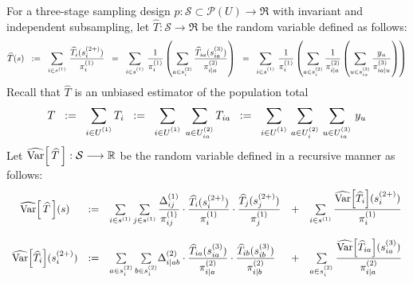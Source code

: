 \begin{theorem}
\mbox{}
\vskip 0.1cm
\noindent
For a three-stage sampling design $p : \mathcal{S} \subset \mathcal{P}(U) \longrightarrow \Re$
with invariant and independent subsampling,
let $\widehat{T} : \mathcal{S} \longrightarrow \Re$ be the random variable defined as follows:
\begin{equation*}
\widehat{T}(s)
\;\;:=\;\; \sum_{i\in s^{(1)}}\,\frac{\widehat{T}_{i}(s^{(2+)}_{i})}{\pi^{(1)}_{i}}
\;\; =\;\; \sum_{i\in s^{(1)}_{\color{white}i}}\,\frac{1}{\pi^{(1)}_{i}}\left(\sum_{a \in s^{(2)}_{i}} \dfrac{\widehat{T}_{ia}(s^{(3)}_{ia})}{\pi^{(2)}_{i\vert a}}\right)
\;\; =\;\; \sum_{i\in s^{(1)}_{\color{white}i}}\,\frac{1}{\pi^{(1)}_{i}}\left(\sum_{a \in s^{(2)}_{i}} \dfrac{1}{\pi^{(2)}_{i\vert a}}\left(\sum_{u\in s^{(3)}_{ia}}\dfrac{y_{u}}{\pi^{(3)}_{ia\vert u}}\right)\right)
\end{equation*}
Recall that $\widehat{T}$ is an unbiased estimator of the population total
\begin{equation*}
T
\;\;:= \;\; \sum_{i\in U^{(1)}_{\color{white} i}}T_{i}
\;\;:= \;\; \sum_{i\in U^{(1)}_{\color{white} i}}\;\sum_{a \in U^{(2)}_{ia}}T_{ia}
\;\;:=\;\; \sum_{i \in U^{(1)}_{\color{white} i}}\,\sum_{a \in U^{(2)}_{i}}\,\sum_{u \in U^{(3)}_{ia}}\,y_{u}
\end{equation*}
Let $\widehat{\textnormal{Var}}\!\left[\,\widehat{T}\,\right] : \mathcal{S} \longrightarrow \mathbb{R}$
be the random variable defined in a recursive manner as follows:
\begin{equation*}
\begin{array}{cclcl}
\widehat{\Var}\!\left[\,\widehat{T}\,\right]\!(s)
&:=&
\underset{i\in s^{(1)}}{\sum}\,\underset{j\in s^{(1)}}\sum\,
\dfrac{\Delta^{(1)}_{ij}}{\pi^{(1)}_{ij}}
\cdot
\dfrac{\widehat{T}_{i}(s^{(2+)}_{i})}{\pi^{(1)}_{i}}
\cdot
\dfrac{\widehat{T}_{j}(s^{(2+)}_{j})}{\pi^{(1)}_{j}}
&+&
\underset{i\in s^{(1)}}{\sum}\,\dfrac{\widehat{\Var}\!\left[\widehat{T}_{i}\right]\!(s^{(2+)}_{i})}{\pi^{(1)}_{i}}
\\ \\
\widehat{\Var}\!\left[\widehat{T}_{i}\right]\!(s^{(2+)}_{i})
&:=&
\underset{a\in s^{(2)}_{i}}{\sum}\,\underset{b\in s^{(2)}_{i}}{\sum}
\Delta^{(2)}_{i \vert ab}\cdot\dfrac{\widehat{T}_{ia}(s^{(3)}_{ia})}{\pi^{(2)}_{i \vert a}}\cdot\dfrac{\widehat{T}_{ib}(s^{(3)}_{ib})}{\pi^{(2)}_{i \vert b}}
&+&
\underset{a \in s^{^{(2)}}_{i}}{\sum}\,\dfrac{\widehat{\Var}\!\left[\widehat{T}_{ia}\right]\!(s^{(3)}_{ia})}{\pi^{(2)}_{i \vert a}}
\\ \\

\end{array}
\end{equation*}
\end{theorem}

